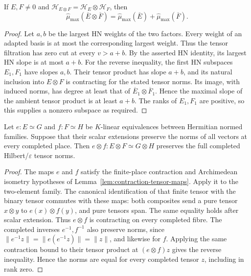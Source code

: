\begin{lemma}
\label{lem:maximal-slope-from-tensor-hn}
\leanok
If $E,F\ne0$ and $\mathcal H_{E\otimes F}=\mathcal H_E\otimes\mathcal H_F$,
then
\[
 \widehat\mu_{\max}(\overline E\otimes\overline F)=
 \widehat\mu_{\max}(\overline E)+\widehat\mu_{\max}(\overline F).
\]
\end{lemma}
\begin{proof}
Let $a,b$ be the largest HN weights of the two factors. Every weight of
an adapted basis is at most the corresponding largest weight. Thus the
tensor filtration has zero cut at every $v>a+b$. By the asserted HN
identity, its largest HN slope is at most $a+b$.
For the reverse inequality, the first HN subspaces $E_1,F_1$ have
slopes $a,b$. Their tensor product has slope $a+b$, and its natural
inclusion into $E\otimes F$ is contracting for the stated tensor norms.
Its image, with induced norms, has degree at least that of
$\overline E_1\otimes\overline F_1$. Hence the maximal slope of the
ambient tensor product is at least $a+b$. The ranks of $E_1,F_1$ are
positive, so this supplies a nonzero subspace as required.
\end{proof}

\begin{lemma}
\label{lem:binary-tensor-isometry}
\leanok
Let $e:E\simeq G$ and $f:F\simeq H$ be $K$-linear equivalences
between Hermitian normed families. Suppose that their scalar extensions
preserve the norms of all vectors at every completed place. Then
$e\otimes f:E\otimes F\simeq G\otimes H$ preserves the full completed
Hilbert/$\varepsilon$ tensor norms.
\end{lemma}
\begin{proof}
The maps $e$ and $f$ satisfy the finite-place contraction and
Archimedean isometry hypotheses of Lemma~\ref{lem:contraction-tensor-maps}.
Apply it to the two-element family. The canonical identification of
that finite tensor with the binary tensor commutes with these maps:
both composites send a pure tensor $x\otimes y$ to $e(x)\otimes f(y)$,
and pure tensors span. The same equality holds after scalar extension.
Thus $e\otimes f$ is contracting on every completed fibre.
The completed inverses $e^{-1},f^{-1}$ also preserve norms, since
$\|e^{-1}z\|=\|e(e^{-1}z)\|=\|z\|$, and likewise for $f$.
Applying the same contraction bound to their tensor product at
$(e\otimes f)z$ gives the reverse inequality. Hence the norms are equal
for every completed tensor $z$, including in rank zero.
\end{proof}

